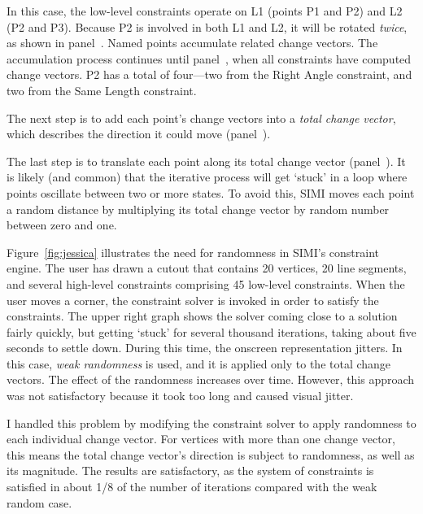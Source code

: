 In this case, the low-level constraints operate on L1 (points P1 and
P2) and L2 (P2 and P3). Because P2 is involved in both L1 and L2, it
will be rotated \textit{twice}, as shown in
panel~\textit{}. Named points accumulate
related change vectors. The accumulation process continues until
panel~\textit{}, when all constraints have
computed change vectors. P2 has a total of four---two from the Right
Angle constraint, and two from the Same Length constraint.

The next step is to add each point's change vectors into a
\textit{total change vector}, which describes the direction it could
move (panel~\textit{}).

The last step is to translate each point along its total change vector
(panel~\textit{}). It is likely (and
common) that the iterative process will get `stuck' in a loop where
points oscillate between two or more states. To avoid this, SIMI moves
each point a random distance by multiplying its total change vector by
random number between zero and one.



Figure~\ref{fig:jessica} illustrates the need for randomness in SIMI's
constraint engine. The user has drawn a cutout that contains 20
vertices, 20 line segments, and several high-level constraints
comprising 45 low-level constraints. When the user moves a corner, the
constraint solver is invoked in order to satisfy the constraints. The
upper right graph shows the solver coming close to a solution fairly
quickly, but getting `stuck' for several thousand iterations, taking
about five seconds to settle down. During this time, the onscreen
representation jitters. In this case, \textit{weak randomness} is
used, and it is applied only to the total change vectors. The effect
of the randomness increases over time. However, this approach was not
satisfactory because it took too long and caused visual jitter.

I handled this problem by modifying the constraint solver to apply
randomness to each individual change vector. For vertices with more
than one change vector, this means the total change vector's direction
is subject to randomness, as well as its magnitude. The results are
satisfactory, as the system of constraints is satisfied in about 1/8
of the number of iterations compared with the weak random case.

